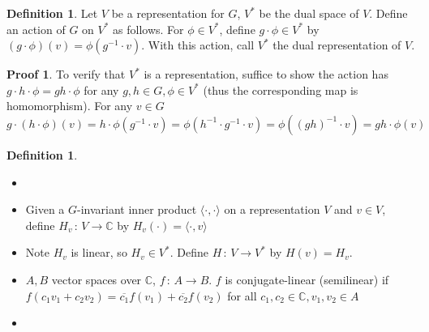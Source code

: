 \documentclass{book}
\newcommand{\C}{\mathbb{C}}
\newcommand{\inner}[1]{\langle #1 \rangle}
\theoremstyle{definition}
\newtheorem{definition}[lemma]{Definition}
\theoremstyle{remarkstyle}
\newtheorem*{myproof}{Proof}%
\begin{document}
\begin{definition}
    Let $V$ be a representation for $G$, $V^*$ be the dual space of $V$. Define an action of $G$ on $V^*$ as follows. For $\phi\in V^*$, define $g\cdot\phi\in V^*$ by $(g\cdot\phi)(v)=\phi(g^{-1}\cdot v) $. With this action, call $V^*$ the dual representation of $V$.
\end{definition}
\begin{myproof}
    To verify that $V^*$ is a representation, suffice to show the action has $g\cdot h\cdot \phi=gh\cdot \phi$ for any $g,h\in G, \phi \in V^*$ (thus the corresponding map is homomorphism). For any $v\in G$
    $$
    g\cdot(h\cdot\phi)(v) = h\cdot\phi(g^{-1}\cdot v) = \phi(h^{-1}\cdot g^{-1} \cdot v) = \phi((gh)^{-1}\cdot v) = gh \cdot \phi(v)
    $$ \newline
\end{myproof}

\begin{definition}
    \begin{itemize}
        \item[]
        \item Given a $G$-invariant inner product $\inner{\cdot,\cdot}$ on a representation $V$ and $v\in V$, define $H_v\,:\,V\rightarrow\C$ by $H_v(\cdot)=\inner{\cdot,v}$
        \item Note $H_v$ is linear, so $H_v\in V^*$. Define $H\,:\,V\rightarrow V^*$ by $H(v)=H_v$.
        \item $A,B$ vector spaces over $\C$, $f\,:\,A\rightarrow B$. $f$ is conjugate-linear (semilinear) if $f(c_1v_1+c_2v_2)=\overline{c_1}f(v_1)+\overline{c_2}f(v_2)$ for all $c_1,c_2\in \C, v_1,v_2\in A$
        \item[] 
    \end{itemize}
\end{definition}
\end{document}
